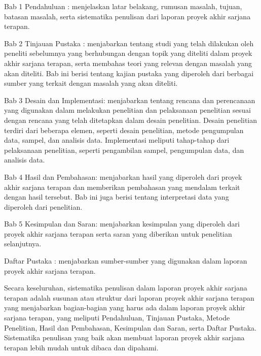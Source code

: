 \begin{packed_enum}
    \item Bab 1 Pendahuluan : menjelaskan latar belakang, rumusan masalah, tujuan, batasan masalah, serta sistematika penulisan dari laporan proyek akhir sarjana terapan.
    \item Bab 2 Tinjauan Pustaka : menjabarkan tentang studi yang telah dilakukan oleh peneliti sebelumnya yang berhubungan dengan topik yang diteliti dalam proyek akhir sarjana terapan, serta membahas teori yang relevan dengan masalah yang akan diteliti. Bab ini berisi tentang kajian pustaka yang diperoleh dari berbagai sumber yang terkait dengan masalah yang akan diteliti.
    \item Bab 3 Desain dan Implementasi: menjabarkan tentang rencana dan perencanaan yang digunakan dalam melakukan penelitian dan pelaksanaan penelitian sesuai dengan rencana yang telah ditetapkan dalam desain penelitian. Desain penelitian terdiri dari beberapa elemen, seperti desain penelitian, metode pengumpulan data, sampel, dan analisis data. Implementasi meliputi tahap-tahap dari pelaksanaan penelitian, seperti pengambilan sampel, pengumpulan data, dan analisis data.
    \item Bab 4 Hasil dan Pembahasan: menjabarkan hasil yang diperoleh dari proyek akhir sarjana terapan dan memberikan pembahasan yang mendalam terkait dengan hasil tersebut. Bab ini juga berisi tentang interpretasi data yang diperoleh dari penelitian.
    \item Bab 5 Kesimpulan dan Saran: menjabarkan kesimpulan yang diperoleh dari proyek akhir sarjana terapan serta saran yang diberikan untuk penelitian selanjutnya.
    \item Daftar Pustaka : menjabarkan sumber-sumber yang digunakan dalam laporan proyek akhir sarjana terapan.
\end{packed_enum}

Secara keseluruhan, sistematika penulisan dalam laporan proyek akhir sarjana terapan adalah susunan atau struktur dari laporan proyek akhir sarjana terapan yang menjabarkan bagian-bagian yang harus ada dalam laporan proyek akhir sarjana terapan, yang meliputi Pendahuluan, Tinjauan Pustaka, Metode Penelitian, Hasil dan Pembahasan, Kesimpulan dan Saran, serta Daftar Pustaka. Sistematika penulisan yang baik akan membuat laporan proyek akhir sarjana terapan lebih mudah untuk dibaca dan dipahami.